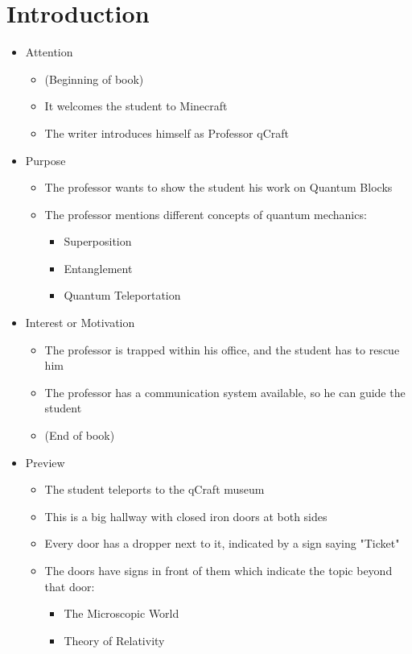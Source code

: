 \documentclass[11pt,twoside]{report} %
\begin{document}
\section{Introduction}

\begin{itemize}
	\item Attention
	\begin{itemize}
		\item (Beginning of book)
		\item It welcomes the student to Minecraft
		\item The writer introduces himself as Professor qCraft
	\end{itemize}
	\item Purpose
	\begin{itemize}
		\item The professor wants to show the student his work on Quantum Blocks
		\item The professor mentions different concepts of quantum mechanics:
		\begin{itemize}
			\item Superposition
			\item Entanglement
			\item Quantum Teleportation
		\end{itemize}
	\end{itemize}
	\item Interest or Motivation
	\begin{itemize}
		\item The professor is trapped within his office, and the student has to rescue him
		\item The professor has a communication system available, so he can guide the student
		\item (End of book)
	\end{itemize}
	\item Preview
	\begin{itemize}
		\item The student teleports to the qCraft museum
		\item This is a big hallway with closed iron doors at both sides
		\item Every door has a dropper next to it, indicated by a sign saying "Ticket"
		\item The doors have signs in front of them which indicate the topic beyond that door:
		\begin{itemize}
			\item The Microscopic World
			\item Theory of Relativity

\end{itemize}
\end{itemize}
\end{itemize}
\end{document}
